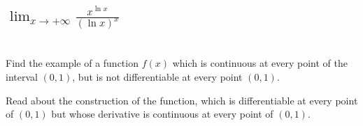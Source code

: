 \documentclass[]{article}
\begin{document}
\subsection{
    $\lim_{x \to +\infty} \frac{x^{\ln{x}}}{(\ln{x})^x}$
}












\newpage
\section{}
Find the example of a function $f(x)$ which is continuous at every point of the interval $(0,1)$, but is not differentiable at every point $(0,1)$.

Read about the construction of the function, which is differentiable at every point of $(0,1)$ but whose derivative is continuous at every point of $(0,1)$.
\end{document}
